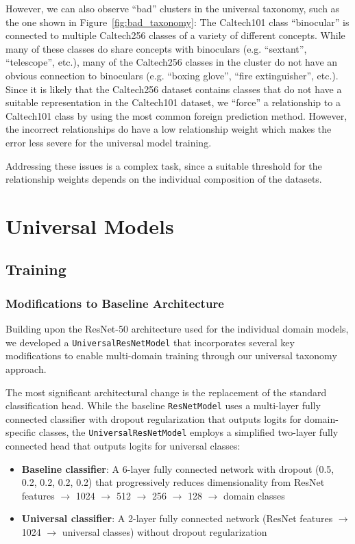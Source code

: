 However, we can also observe \enquote{bad} clusters in the universal taxonomy,
such as the one shown in Figure~\ref{fig:bad_taxonomy}:
The Caltech101 class \enquote{binocular} is connected to multiple Caltech256 classes
of a variety of different concepts.
While many of these classes do share concepts with binoculars (e.g. \enquote{sextant}, \enquote{telescope}, etc.),
many of the Caltech256 classes in the cluster do not have an obvious connection to binoculars
(e.g. \enquote{boxing glove}, \enquote{fire extinguisher}, etc.).
Since it is likely that the Caltech256 dataset contains classes that do not have a suitable representation in the Caltech101 dataset,
we \enquote{force} a relationship to a Caltech101 class by using the most common foreign prediction method.
However, the incorrect relationships do have a low relationship weight which makes
the error less severe for the universal model training.

Addressing these issues is a complex task, since a suitable threshold for the relationship weights
depends on the individual composition of the datasets.


\section{Universal Models} \label{sec:universal_models}

\subsection{Training}

\subsubsection{Modifications to Baseline Architecture}

Building upon the ResNet-50 architecture used for the individual domain models, we developed a \texttt{UniversalResNetModel} that incorporates several key modifications to enable multi-domain training through our universal taxonomy approach.

The most significant architectural change is the replacement of the standard classification head. While the baseline \texttt{ResNetModel} uses a multi-layer fully connected classifier with dropout regularization that outputs logits for domain-specific classes, the \texttt{UniversalResNetModel} employs a simplified two-layer fully connected head that outputs logits for universal classes:

\begin{itemize}
      \item \textbf{Baseline classifier}: A 6-layer fully connected network with dropout (0.5, 0.2, 0.2, 0.2, 0.2) that progressively reduces dimensionality from ResNet features $\rightarrow$ 1024 $\rightarrow$ 512 $\rightarrow$ 256 $\rightarrow$ 128 $\rightarrow$ domain classes
      \item \textbf{Universal classifier}: A 2-layer fully connected network (ResNet features $\rightarrow$ 1024 $\rightarrow$ universal classes) without dropout regularization
\end{itemize}

